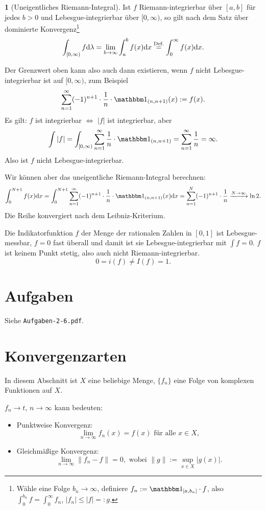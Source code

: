 \documentclass[
 a4paper,
 12pt,
 parskip=half
 ]{scrreprt}
\theoremstyle{plain}
\theoremstyle{definition}
\newtheorem{prgp}[thm]{} %
\numberwithin{equation}{section}
\begin{document}
\begin{prgp}[Uneigentliches Riemann-Integral]
 Ist $f$ Riemann-integrierbar über $[a,b]$ für jedes $b > 0$ und Lebesgue-integrierbar über $[0,\infty)$, so gilt nach dem Satz über dominierte Konvergenz\footnote{Wähle eine Folge $b_n \to \infty$, definiere $f_n := \ind_{[a,b_n]} \cdot f$, also $\int_0^{b_n} f = \int_0^\infty f_n$, $|f_n| \le |f| =: g$.}
 \[ \int_{[0,\infty)} f \mathrm{d} \lambda = \lim_{b \to \infty} \int_a^b f(x) \mathrm{d} x \overset{\text{Def.}}{=} \int_0^\infty f(x) \mathrm{d} x. \]
\end{prgp}

Der Grenzwert oben kann also auch dann existieren, wenn $f$ nicht Lebesgue-integrierbar ist auf $[0,\infty)$, zum Beispiel
\[ \sum_{n=1}^\infty (-1)^{n+1} \cdot \rez{n} \cdot \ind_{(n,n+1)}(x) := f(x). \]
Es gilt: $f$ ist integrierbar $\Leftrightarrow$ $|f|$ ist integrierbar, aber
\[ \int |f| = \int_{[0,\infty)} \sum_{n=1}^\infty \rez{n} \cdot \ind_{(n,n+1)} = \sum_{n=1}^\infty \rez{n} = \infty. \]
Also ist $f$ nicht Lebesgue-integrierbar. 

Wir können aber das uneigentliche Riemann-Integral berechnen:
\[ \int_0^{N+1} f(x) \diffop x = \int_0^{N+1} \sum_{n=1}^\infty (-1)^{n+1} \cdot \rez{n} \cdot \ind_{(n,n+1)}(x) \diffop x = \sum_{n=1}^N (-1)^{n+1} \cdot \rez{n} \xrightarrow{N \to \infty} \ln 2. \]
Die Reihe konvergiert nach dem Leibniz-Kriterium.

Die Indikatorfunktion $f$ der Menge der rationalen Zahlen in $[0,1]$ ist Lebesgue-messbar, $f=0$ fast überall und damit ist sie Lebesgue-integrierbar mit $\int f = 0$. $f$ ist keinem Punkt stetig, also auch nicht Riemann-integrierbar.
\[ 0 = i(f) \ne I(f) = 1. \]

\section{Aufgaben}
Siehe \verb+Aufgaben-2-6.pdf+.

\section{Konvergenzarten}
In diesem Abschnitt ist $X$ eine beliebige Menge, $\{ f_n \}$ eine Folge von komplexen Funktionen auf $X$.

$f_n \to t$, $n \to \infty$ kann bedeuten:
\begin{itemize}
 \item Punktweise Konvergenz: 
  \[ \lim_{n \to \infty} f_n(x) = f(x) \text{ für alle } x \in X, \]
 \item Gleichmäßige Konvergenz:
  \[ \lim_{n \to \infty} \| f_n - f \| = 0, \text{ wobei } \| g \| := \sup_{x \in X} | g(x) |. \]
\end{itemize}
\end{document}

